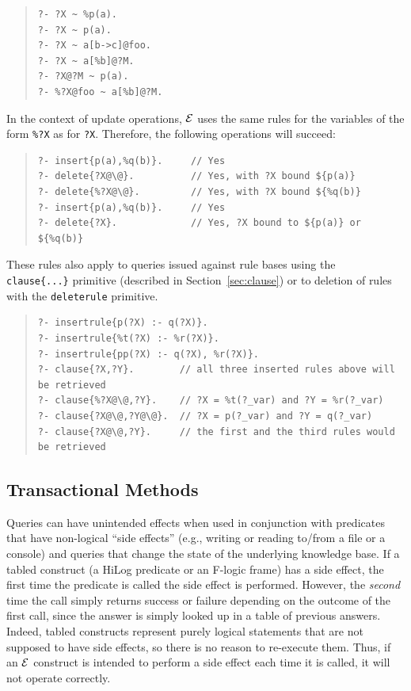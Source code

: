 \documentclass[11pt]{article}
\newcommand{\ERGO}{\mbox{\ensuremath{\cal{E}}\smaller{{\sc{RGO}}}}\xspace}
\newcommand{\FLSYSTEM}{\ERGO}
\begin{document}
\begin{quote}
\begin{verbatim}
?- ?X ~ %p(a).      
?- ?X ~ p(a).         
?- ?X ~ a[b->c]@foo.  
?- ?X ~ a[%b]@?M.      
?- ?X@?M ~ p(a).     
?- %?X@foo ~ a[%b]@?M.
\end{verbatim}
\end{quote}

In the context of update operations, \FLSYSTEM uses the same rules for
the variables of the form {\tt \%?X} as for {\tt ?X}. Therefore, the
following operations will succeed:
\begin{quote}
\begin{verbatim}
?- insert{p(a),%q(b)}.     // Yes
?- delete{?X@\@}.          // Yes, with ?X bound ${p(a)}
?- delete{%?X@\@}.         // Yes, with ?X bound ${%q(b)}
?- insert{p(a),%q(b)}.     // Yes
?- delete{?X}.             // Yes, ?X bound to ${p(a)} or ${%q(b)}
\end{verbatim}
\end{quote}

These rules also apply to queries issued against rule bases using the {\tt
  clause\{...\}} primitive (described in Section~\ref{sec:clause}) or to deletion of rules with the {\tt deleterule} primitive.

\begin{quote}
\begin{verbatim}
?- insertrule{p(?X) :- q(?X)}.  
?- insertrule{%t(?X) :- %r(?X)}.
?- insertrule{pp(?X) :- q(?X), %r(?X)}.
?- clause{?X,?Y}.        // all three inserted rules above will be retrieved
?- clause{%?X@\@,?Y}.    // ?X = %t(?_var) and ?Y = %r(?_var)
?- clause{?X@\@,?Y@\@}.  // ?X = p(?_var) and ?Y = q(?_var)
?- clause{?X@\@,?Y}.     // the first and the third rules would be retrieved
\end{verbatim}
\end{quote}

\subsection{Transactional Methods}\label{sec-proc-methods}

%
Queries can
have unintended effects when used in conjunction with
predicates that have non-logical ``side effects''
(e.g., writing or reading to/from a file or a console) and queries that change the state of
the underlying knowledge base.  If a tabled construct (a HiLog predicate
or an F-logic frame)
has a side effect, the first time the
predicate is called the side effect is performed. However, the \emph{second} time the
call simply returns success or failure depending on the outcome of
the first call, since the answer is simply looked
up in a table of previous answers. Indeed, tabled constructs represent
purely logical statements that are not supposed to have side effects, so
there is no reason to re-execute them.
Thus, if an \FLSYSTEM construct
is intended to perform a side effect each time it is
called, it will not operate correctly.
\end{document}
